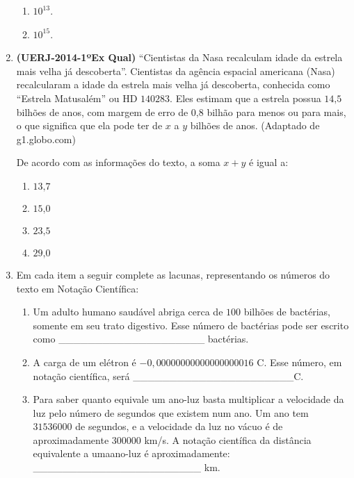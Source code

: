 \begin{enumerate}
\begin{enumerate}
\item {} 
\(10^{13}\).

\item {} 
\(10^{15}\).

\end{enumerate}

\item \textbf{(UERJ-2014-1ºEx Qual)} “Cientistas da Nasa recalculam idade da estrela mais velha já descoberta”. Cientistas da agência espacial americana (Nasa) recalcularam a idade da estrela mais velha já descoberta, conhecida como “Estrela Matusalém” ou HD \(140283\). Eles estimam que a estrela possua \(14\text{,}5\) bilhões de anos, com margem de erro de \(0\text{,}8\) bilhão para menos ou para mais, o que significa que ela pode ter de \(x\) a \(y\) bilhões de anos. (Adaptado de g1.globo.com)

De acordo com as informações do texto, a soma \(x + y\) é igual a:
\begin{enumerate}
\item {} 
\(13\text{,}7\)

\item {} 
\(15\text{,}0\)

\item {} 
\(23\text{,}5\)

\item {} 
\(29\text{,}0\)

\end{enumerate}

\item Em cada item a seguir complete as lacunas, representando os números do texto em Notação Científica:

\begin{enumerate}
\item {} 
Um adulto humano saudável abriga cerca de \(100\) bilhões de bactérias, somente em seu trato digestivo. Esse número de bactérias pode ser escrito como \_\_\_\_\_\_\_\_\_\_\_\_\_\_\_\_\_\_\_\_ bactérias.

\item {} 
A carga de um elétron é \(-0,00000000000000000016\) C. Esse número, em notação científica, será \_\_\_\_\_\_\_\_\_\_\_\_\_\_\_\_\_\_\_\_\_\_C.

\item {} 
Para saber quanto equivale um ano-luz basta multiplicar a velocidade da luz pelo número de segundos que existem num ano. Um ano tem \(31 536 000\) de segundos, e a velocidade da luz no vácuo é de aproximadamente \(300 000\) km/s. A notação científica da distância equivalente a umaano-luz é aproximadamente:  \_\_\_\_\_\_\_\_\_\_\_\_\_\_\_\_\_\_\_\_\_\_\_ km.


\end{enumerate}
\end{enumerate}
